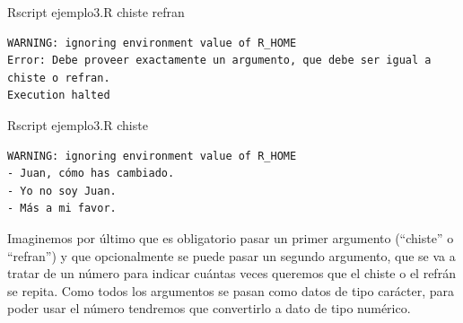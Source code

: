 \documentclass[
]{book}
\newenvironment{Shaded}{\begin{snugshade}}{\end{snugshade}}
\newcommand{\ExtensionTok}[1]{#1}
\newcommand{\NormalTok}[1]{#1}
\begin{document}
\begin{Shaded}
\begin{Highlighting}[]
\ExtensionTok{Rscript}\NormalTok{ ejemplo3.R chiste refran}
\end{Highlighting}
\end{Shaded}

\begin{verbatim}
WARNING: ignoring environment value of R_HOME
Error: Debe proveer exactamente un argumento, que debe ser igual a chiste o refran.
Execution halted
\end{verbatim}

\begin{Shaded}
\begin{Highlighting}[]
\ExtensionTok{Rscript}\NormalTok{ ejemplo3.R chiste}
\end{Highlighting}
\end{Shaded}

\begin{verbatim}
WARNING: ignoring environment value of R_HOME
- Juan, cómo has cambiado.
- Yo no soy Juan.
- Más a mi favor.
\end{verbatim}

Imaginemos por último que es obligatorio pasar un primer argumento (``chiste'' o ``refran'') y que opcionalmente se puede pasar un segundo argumento, que se va a tratar de un número para indicar cuántas veces queremos que el chiste o el refrán se repita. Como todos los argumentos se pasan como datos de tipo carácter, para poder usar el número tendremos que convertirlo a dato de tipo numérico.
\end{document}

